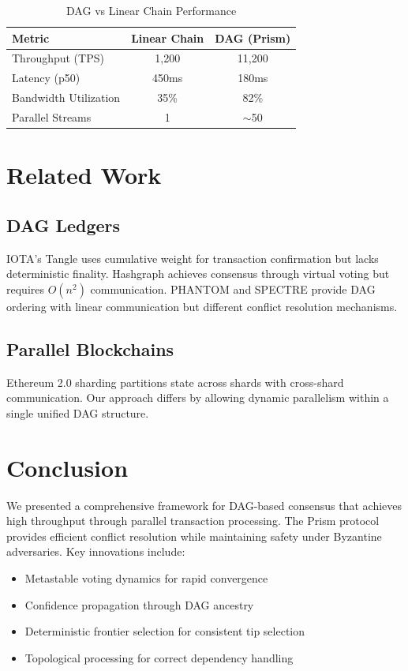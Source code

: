 \documentclass[11pt,a4paper]{article}
\begin{document}
\begin{table}[h]
\centering
\caption{DAG vs Linear Chain Performance}
\begin{tabular}{@{}lcc@{}}
\toprule
Metric & Linear Chain & DAG (Prism) \\
\midrule
Throughput (TPS) & 1,200 & 11,200 \\
Latency (p50) & 450ms & 180ms \\
Bandwidth Utilization & 35\% & 82\% \\
Parallel Streams & 1 & $\sim$50 \\
\bottomrule
\end{tabular}
\end{table}

\section{Related Work}

\subsection{DAG Ledgers}

IOTA's Tangle uses cumulative weight for transaction confirmation but lacks deterministic finality. Hashgraph achieves consensus through virtual voting but requires $O(n^2)$ communication. PHANTOM and SPECTRE provide DAG ordering with linear communication but different conflict resolution mechanisms.

\subsection{Parallel Blockchains}

Ethereum 2.0 sharding partitions state across shards with cross-shard communication. Our approach differs by allowing dynamic parallelism within a single unified DAG structure.

\section{Conclusion}

We presented a comprehensive framework for DAG-based consensus that achieves high throughput through parallel transaction processing. The Prism protocol provides efficient conflict resolution while maintaining safety under Byzantine adversaries. Key innovations include:

\begin{itemize}
    \item Metastable voting dynamics for rapid convergence
    \item Confidence propagation through DAG ancestry
    \item Deterministic frontier selection for consistent tip selection
    \item Topological processing for correct dependency handling
\end{itemize}
\end{document}
